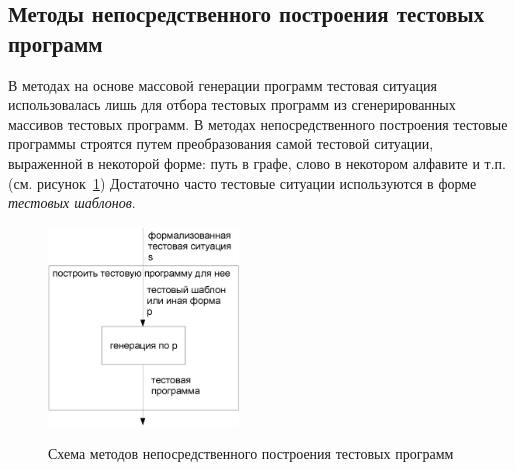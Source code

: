 \subsection{Методы непосредственного построения тестовых\\ программ}

В методах на основе массовой генерации программ тестовая ситуация использовалась лишь для отбора тестовых программ из сгенерированных массивов тестовых программ. В методах непосредственного построения тестовые программы строятся путем преобразования самой тестовой ситуации, выраженной в некоторой форме: путь в графе, слово в некотором алфавите и т.п. (см. рисунок~\ref{fig:immediate_methods}) Достаточно часто тестовые ситуации используются в форме \emph{тестовых шаблонов}.


\begin{figure}[h] \center
  \includegraphics[width=0.45\textwidth]{1.review/im_methods}\\
  \caption{Схема методов непосредственного построения тестовых программ}\label{fig:immediate_methods}
\end{figure}

